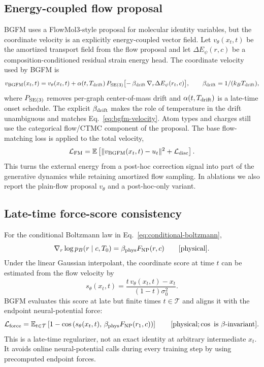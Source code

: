 \documentclass{article}
\begin{document}
\subsection{Energy-coupled flow proposal}

BGFM uses a FlowMol3-style proposal for molecular identity variables, but
the coordinate velocity is an explicitly energy-coupled vector field.  Let
$v_\theta(x_t,t)$ be the amortized transport field from the flow proposal and
let $\Delta E_\psi(r,c)$ be a composition-conditioned residual strain energy
head.  The coordinate velocity used by BGFM is
\begin{equation}
    v_{\rm BGFM}(x_t,t)
    = v_\theta(x_t,t) + \alpha(t, T_{\rm drift})\,P_{\rm SE(3)}\bigl[-\,\beta_{\rm drift}\,\nabla_r\Delta E_\psi(r_t,c)\bigr],
    \qquad \beta_{\rm drift}=1/(k_B T_{\rm drift}),
    \label{eq:energy-coupled-vf}
\end{equation}
where $P_{\rm SE(3)}$ removes per-graph center-of-mass drift and
$\alpha(t, T_{\rm drift})$ is a late-time onset schedule. The explicit
$\beta_{\rm drift}$ makes the role of temperature in the drift unambiguous
and matches Eq.~\eqref{eq:bgfm-velocity}. Atom types and charges still use
the categorical flow/CTMC component of the proposal.  The base flow-matching
loss is applied to the total velocity,
\begin{equation}
    \mathcal L_{\rm FM}=\mathbb E\left[\|v_{\rm BGFM}(x_t,t)-u_t\|^2 +
    \mathcal L_{\rm disc}\right].
\end{equation}
This turns the external energy from a post-hoc correction signal into part of
the generative dynamics while retaining amortized flow sampling.  In ablations
we also report the plain-flow proposal $v_\theta$ and a post-hoc-only variant.

\subsection{Late-time force-score consistency}

For the conditional Boltzmann law in Eq.~\eqref{eq:conditional-boltzmann},
\begin{equation}
    \nabla_r \log p_B(r\mid c,T_0)=\beta_{\rm phys} F_{\rm NP}(r,c)
    \qquad [\text{physical}].
\end{equation}
Under the linear Gaussian interpolant, the coordinate score at time $t$
can be estimated from the flow velocity by
\begin{equation}
    s_\theta(x_t,t)=\frac{t\,v_\theta(x_t,t)-x_t}{(1-t)\sigma_0^2}.
\end{equation}
BGFM evaluates this score at late but finite times
$t\in\mathcal T$ and aligns it with the endpoint neural-potential force:
\begin{equation}
    \mathcal L_{\rm force}=\mathbb E_{t\in\mathcal T}
    \left[1-\cos\left(s_\theta(x_t,t),\,\beta_{\rm phys} F_{\rm NP}(r_1,c)\right)\right]
    \qquad [\text{physical}; \cos \text{ is } \beta\text{-invariant}].
    \label{eq:force-loss}
\end{equation}
This is a late-time regularizer, not an exact identity at arbitrary
intermediate $x_t$. It avoids online neural-potential calls during every
training step by using precomputed endpoint forces.
\end{document}
